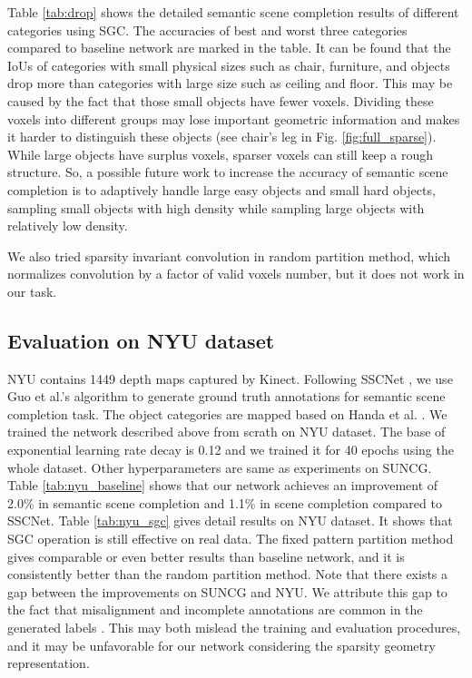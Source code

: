 \documentclass[runningheads]{llncs}
\begin{document}
Table \ref{tab:drop} shows the detailed semantic scene completion results of different categories using SGC. The accuracies of best and worst three categories compared to baseline network are marked in the table. It can be found that the IoUs of categories with small physical sizes such as chair, furniture, and objects drop more than categories with large size such as ceiling and floor. This may be caused by the fact that those small objects have fewer voxels. Dividing these voxels into different groups may lose important geometric information and makes it harder to distinguish these objects (see chair{'}s leg in Fig. \ref{fig:full_sparse}). While large objects have surplus voxels, sparser voxels can still keep a rough structure. So, a possible future work to increase the accuracy of semantic scene completion is to adaptively handle large easy objects and small hard objects, sampling small objects with high density while sampling large objects with relatively low density.

We also tried sparsity invariant convolution \cite{2017arXiv170806500U} in random partition method, which normalizes convolution by a factor of valid voxels number, but it does not work in our task.


\subsection{Evaluation on NYU dataset}
NYU \cite{silberman2012indoor} contains 1449 depth maps captured by Kinect. Following SSCNet \cite{song2016semantic}, we use Guo et al.{'}s algorithm \cite{guo2015predicting} to generate ground truth annotations for semantic scene completion task. The object categories are mapped based on Handa et al. \cite{handa2016understanding}. We trained the network described above from scrath on NYU dataset. The base of exponential learning rate decay is 0.12 and we trained it for 40 epochs using the whole dataset. Other hyperparameters are same as experiments on SUNCG. Table \ref{tab:nyu_baseline} shows that our network achieves an improvement of 2.0\% in semantic scene completion and 1.1\% in scene completion compared to SSCNet.
Table \ref{tab:nyu_sgc} gives detail results on NYU dataset. It shows that SGC operation is still effective on real data. The fixed pattern partition method gives comparable or even better results than baseline network, and it is consistently better than the random partition method. Note that there exists a gap between the improvements on SUNCG and NYU. We attribute this gap to the fact that misalignment and incomplete annotations are common in the generated labels \cite{guo2015predicting}. This may both mislead the training and evaluation procedures, and it may be unfavorable for our network considering the sparsity geometry representation.
\end{document}
